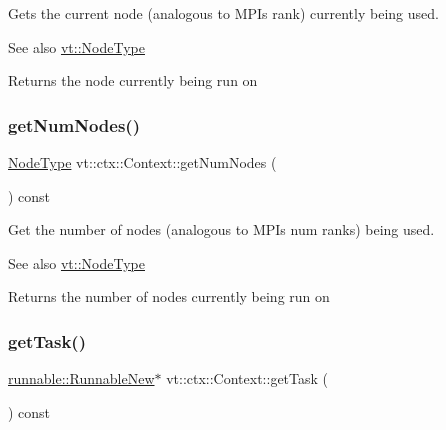 Gets the current node (analogous to M\+PI\textquotesingle{}s rank) currently being used. 

\begin{DoxySeeAlso}{See also}
{\ttfamily \hyperlink{namespacevt_a866da9d0efc19c0a1ce79e9e492f47e2}{vt\+::\+Node\+Type}} 
\end{DoxySeeAlso}
\begin{DoxyReturn}{Returns}
the node currently being run on 
\end{DoxyReturn}
\mbox{\label{structvt_1_1ctx_1_1_context_a7f41071aadf6d5fa9e1b6c703c5ff19d}} 
\subsubsection{\texorpdfstring{get\+Num\+Nodes()}{getNumNodes()}}
{\footnotesize\ttfamily \hyperlink{namespacevt_a866da9d0efc19c0a1ce79e9e492f47e2}{Node\+Type} vt\+::ctx\+::\+Context\+::get\+Num\+Nodes (\begin{DoxyParamCaption}{ }\end{DoxyParamCaption}) const\hspace{0.3cm}{\ttfamily [inline]}}



Get the number of nodes (analogous to M\+PI\textquotesingle{}s num ranks) being used. 

\begin{DoxySeeAlso}{See also}
{\ttfamily \hyperlink{namespacevt_a866da9d0efc19c0a1ce79e9e492f47e2}{vt\+::\+Node\+Type}} 
\end{DoxySeeAlso}
\begin{DoxyReturn}{Returns}
the number of nodes currently being run on 
\end{DoxyReturn}
\mbox{\label{structvt_1_1ctx_1_1_context_a4e78f77717329369173daf1b270a25b0}} 
\subsubsection{\texorpdfstring{get\+Task()}{getTask()}}
{\footnotesize\ttfamily \hyperlink{structvt_1_1runnable_1_1_runnable_new}{runnable\+::\+Runnable\+New}$\ast$ vt\+::ctx\+::\+Context\+::get\+Task (\begin{DoxyParamCaption}{ }\end{DoxyParamCaption}) const\hspace{0.3cm}{\ttfamily [inline]}}




